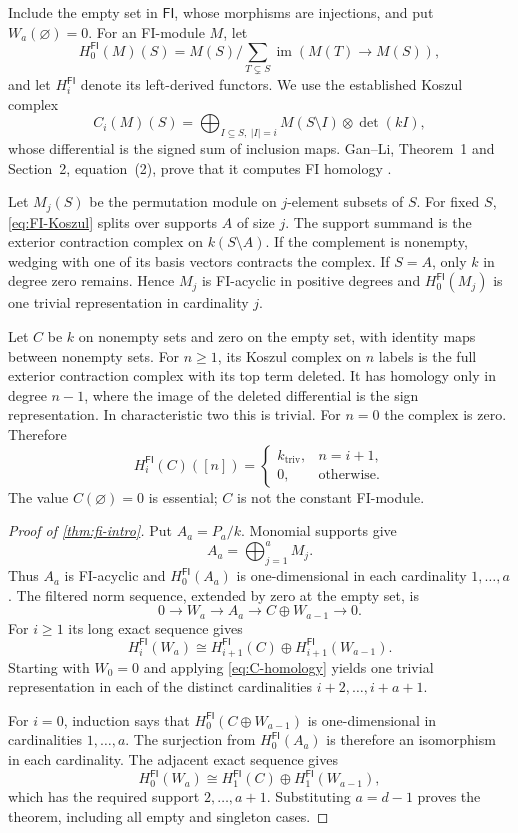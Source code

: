 \documentclass[11pt,a4paper]{article}
\theoremstyle{definition}
\theoremstyle{remark}
\newcommand{\FI}{\mathsf{FI}}
\newcommand{\im}{\operatorname{im}}
\begin{document}
Include the empty set in $\FI$, whose morphisms are injections, and put $W_a(\varnothing)=0$. For an FI-module $M$, let
\[
 H_0^{\FI}(M)(S)=M(S)\Big/\sum_{T\subsetneq S}\im(M(T)\to M(S)),
\]
and let $H_i^{\FI}$ denote its left-derived functors. We use the established Koszul complex
\begin{equation}\label{eq:FI-Koszul}
 C_i(M)(S)=\bigoplus_{I\subseteq S,\ |I|=i}M(S\setminus I)\otimes\det(kI),
\end{equation}
whose differential is the signed sum of inclusion maps. Gan--Li, Theorem~1 and Section~2, equation~(2), prove that it computes FI homology \cite{GanLi}.

Let $M_j(S)$ be the permutation module on $j$-element subsets of $S$. For fixed $S$, \eqref{eq:FI-Koszul} splits over supports $A$ of size $j$. The support summand is the exterior contraction complex on $k(S\setminus A)$. If the complement is nonempty, wedging with one of its basis vectors contracts the complex. If $S=A$, only $k$ in degree zero remains. Hence $M_j$ is FI-acyclic in positive degrees and $H_0^{\FI}(M_j)$ is one trivial representation in cardinality $j$.

Let $C$ be $k$ on nonempty sets and zero on the empty set, with identity maps between nonempty sets. For $n\ge1$, its Koszul complex on $n$ labels is the full exterior contraction complex with its top term deleted. It has homology only in degree $n-1$, where the image of the deleted differential is the sign representation. In characteristic two this is trivial. For $n=0$ the complex is zero. Therefore
\begin{equation}\label{eq:C-homology}
 H_i^{\FI}(C)([n])=
 \begin{cases}k_{\mathrm{triv}},&n=i+1,\\0,&\text{otherwise}.
 \end{cases}
\end{equation}
The value $C(\varnothing)=0$ is essential; $C$ is not the constant FI-module.

\begin{proof}[Proof of \cref{thm:fi-intro}]
Put $A_a=P_a/k$. Monomial supports give
\[
 A_a=\bigoplus_{j=1}^a M_j.
\]
Thus $A_a$ is FI-acyclic and $H_0^{\FI}(A_a)$ is one-dimensional in each cardinality $1,\ldots,a$. The filtered norm sequence, extended by zero at the empty set, is
\[
 0\to W_a\to A_a\to C\oplus W_{a-1}\to0.
\]
For $i\ge1$ its long exact sequence gives
\[
 H_i^{\FI}(W_a)\cong H_{i+1}^{\FI}(C)\oplus H_{i+1}^{\FI}(W_{a-1}).
\]
Starting with $W_0=0$ and applying \eqref{eq:C-homology} yields one trivial representation in each of the distinct cardinalities $i+2,\ldots,i+a+1$.

For $i=0$, induction says that $H_0^{\FI}(C\oplus W_{a-1})$ is one-dimensional in cardinalities $1,\ldots,a$. The surjection from $H_0^{\FI}(A_a)$ is therefore an isomorphism in each cardinality. The adjacent exact sequence gives
\[
 H_0^{\FI}(W_a)\cong H_1^{\FI}(C)\oplus H_1^{\FI}(W_{a-1}),
\]
which has the required support $2,\ldots,a+1$. Substituting $a=d-1$ proves the theorem, including all empty and singleton cases.
\end{proof}
\end{document}

